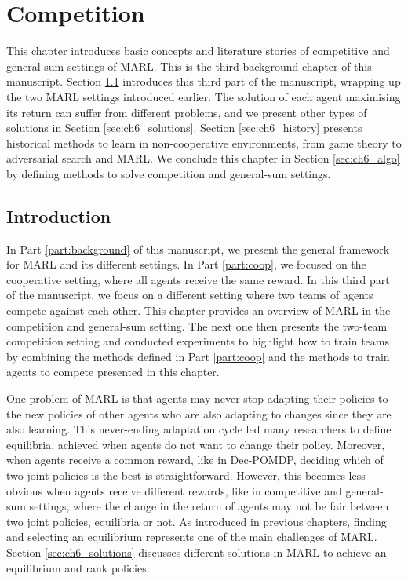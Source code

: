 \chapter{Competition}\label{ch:competition}
\begin{chapter_outline}

This chapter introduces basic concepts and literature stories of competitive and general-sum settings of MARL.
This is the third background chapter of this manuscript.
Section \ref{sec:ch6_intro} introduces this third part of the manuscript, wrapping up the two MARL settings introduced earlier.
The solution of each agent maximising its return can suffer from different problems, and we present other types of solutions in Section \ref{sec:ch6_solutions}.
Section \ref{sec:ch6_history} presents historical methods to learn in non-cooperative environments, from game theory to adversarial search and MARL.
We conclude this chapter in Section \ref{sec:ch6_algo} by defining methods to solve competition and general-sum settings.

\end{chapter_outline}

\section{Introduction}\label{sec:ch6_intro}
In Part \ref{part:background} of this manuscript, we present the general framework for MARL and its different settings.
In Part \ref{part:coop}, we focused on the cooperative setting, where all agents receive the same reward.
In this third part of the manuscript, we focus on a different setting where two teams of agents compete against each other.
This chapter provides an overview of MARL in the competition and general-sum setting.
The next one then presents the two-team competition setting and conducted experiments to highlight how to train teams by combining the methods defined in Part \ref{part:coop} and the methods to train agents to compete presented in this chapter.

One problem of MARL is that agents may never stop adapting their policies to the new policies of other agents who are also adapting to changes since they are also learning.
This never-ending adaptation cycle led many researchers to define equilibria, achieved when agents do not want to change their policy.
Moreover, when agents receive a common reward, like in Dec-POMDP, deciding which of two joint policies is the best is straightforward.
However, this becomes less obvious when agents receive different rewards, like in competitive and general-sum settings, where the change in the return of agents may not be fair between two joint policies, equilibria or not.
As introduced in previous chapters, finding and selecting an equilibrium represents one of the main challenges of MARL.
Section \ref{sec:ch6_solutions} discusses different solutions in MARL to achieve an equilibrium and rank policies.

